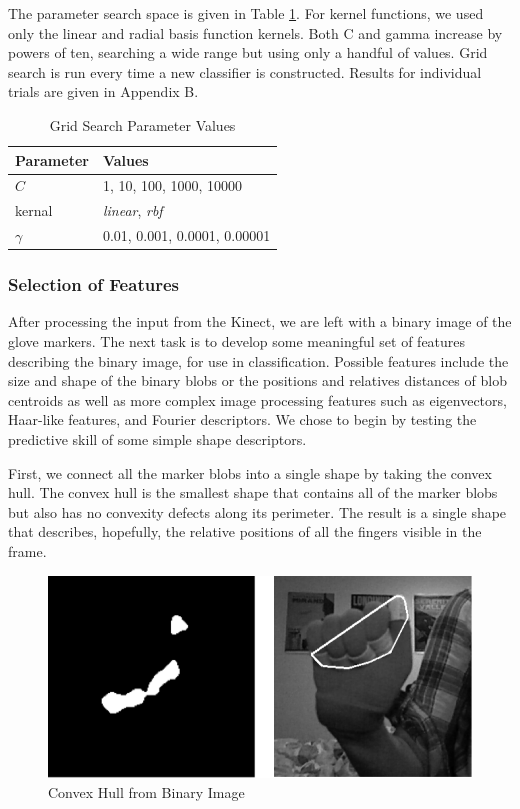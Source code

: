\documentclass[12pt]{article}
\begin{document}
The parameter search space is given in Table \ref{table:gridsearch}. For kernel functions, we used only the linear and radial basis function kernels. Both C and gamma increase by powers of ten, searching a wide range but using only a handful of values. Grid search is run every time a new classifier is constructed. Results for individual trials are given in Appendix B.

\begin{table}
\centering
\caption{Grid Search Parameter Values}
\label{table:gridsearch}
\begin{tabular}{ |l|l| }
\hline
\textbf{Parameter} & \textbf{Values} \\ \hline
\( C \) &  1, 10, 100, 1000, 10000 \\ \hline
kernal & \textit{linear}, \textit{rbf} \\ \hline
\( \gamma \) & 0.01, 0.001, 0.0001, 0.00001 \\ 
\hline
\end{tabular}
\end{table}

\subsubsection{Selection of Features}
After processing the input from the Kinect, we are left with a binary image of the glove markers. The next task is to develop some meaningful set of features describing the binary image, for use in classification. Possible features include the size and shape of the binary blobs or the positions and relatives distances of blob centroids as well as more complex image processing features such as eigenvectors, Haar-like features, and Fourier descriptors. We chose to begin by testing the predictive skill of some simple shape descriptors.

First, we connect all the marker blobs into a single shape by taking the convex hull. The convex hull is the smallest shape that contains all of the marker blobs but also has no convexity defects along its perimeter. The result is a single shape that describes, hopefully, the relative positions of all the fingers visible in the frame. 

\begin{figure}[h]
  \centering
  \includegraphics[scale=1]{Hull.png}
  \caption{Convex Hull from Binary Image}
  \label{fig:hull}
\end{figure}
\end{document}
